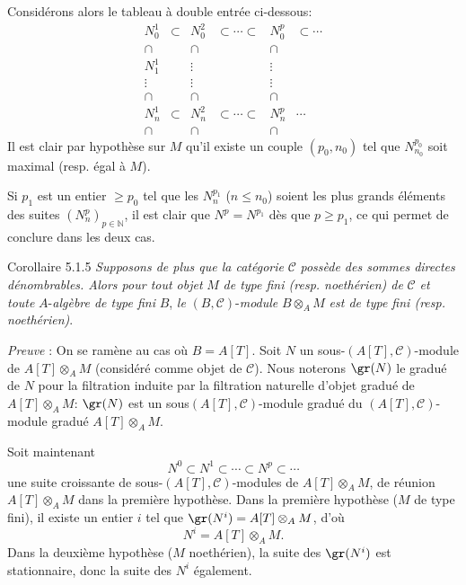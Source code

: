 Considérons alors le tableau à double entrée ci-dessous:
\[
\begin{array}{cccccc}
N_0^1&\subset&N_0^2&\subset\cdots\subset&N_0^p&\subset\cdots\\
\cap&&\cap&&\cap\\
N_1^1&&\vdots&&\vdots\\
\vdots&&\vdots&&\vdots\\
\cap&&\cap&&\cap\\
N_n^1&\subset&N_n^2&\subset\cdots\subset&N_n^p&\cdots\\
\cap&&\cap&&\cap
\end{array}
\]
Il est clair par hypothèse sur \(M\) qu'il existe un couple \((p_0,n_0)\) tel que \(N^{p_0}_{n_0}\) soit maximal (resp. égal à \(M\)).

Si \(p_1\) est un entier \(\ge p_0\) tel que les \(N_n^{p_1}\) (\(n\le n_0\)) soient les plus grands éléments des suites \((N_n^p)_{p\in\mathbb{N}}\), il est clair que \(N^p=N^{p_1}\) dès que \(p\ge p_1\), ce qui permet de conclure dans les deux cas.

\begin{statement}{Corollaire 5.1.5}
\emph{Supposons de plus que la catégorie} \(\mathcal{C}\) \emph{possède des sommes directes dénombrables. Alors pour tout objet} \(M\) \emph{de type fini (resp. noethérien) de} \(\mathcal{C}\) \emph{et toute} \(A\)-\emph{algèbre de type fini} \(B\), \emph{le} \((B,\mathcal{C})\)-\emph{module} \(B\otimes_A M\) \emph{est de type fini (resp. noethérien)}.
\end{statement}

\emph{Preuve} : On se ramène au cas où \(B=A[T]\). Soit \(N\) un sous-\((A[T],\mathcal{C})\)-module de \(A[T]\otimes_A M\) (considéré comme objet de \(\mathcal{C}\)). Nous noterons \(\gr(N)\) le gradué de \(N\) pour la filtration induite par la filtration naturelle d'objet gradué de \(A[T]\otimes_A M\): \(\gr(N)\) est un sous\((A[T],\mathcal{C})\)-module gradué du \((A[T],\mathcal{C})\)-module gradué \(A[T]\otimes_A M\).

Soit
maintenant
\[
N^0\subset N^1\subset\cdots\subset N^p\subset\cdots
\]
une suite croissante de sous-\((A[T],\mathcal{C})\)-modules de \(A[T]\otimes_A M\), de réunion \(A[T]\otimes_A M\) dans la première hypothèse. Dans la première hypothèse (\(M\) de type fini), il existe un entier \(i\) tel que \(\gr(N^i)=A[T]\otimes_A M\), d'où
\[
N^i=A[T]\otimes_A M.
\]
Dans la deuxième hypothèse (\(M\) noethérien), la suite des \(\gr(N^i)\) est stationnaire, donc la suite des \(N^i\) également.


